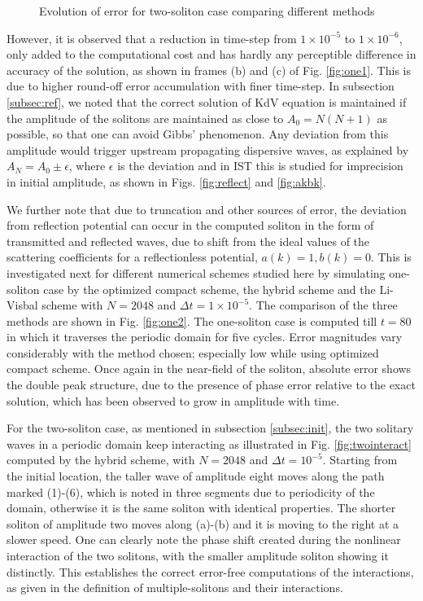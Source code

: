 \documentclass{svjour3}                    %
\begin{document}
\begin{figure}[h!]
{}
\caption{Evolution of error for two-soliton case comparing different methods}
\label{fig:two2}
\end{figure}

However, it is observed that a reduction in time-step from $1 \times 10^{-5}$ to $1 \times 10^{-6}$, only added to the computational cost and has hardly 
any perceptible difference in accuracy of the solution, as shown in frames (b) and (c) of Fig. \ref{fig:one1}. This is due to higher round-off error accumulation with finer time-step. In subsection \ref{subsec:ref}, we noted that the correct solution of KdV equation is maintained if the amplitude of the 
solitons are maintained as close to $A_0 = N(N+1)$ as possible, so that one can avoid Gibbs' phenomenon. Any deviation from this amplitude would trigger upstream propagating dispersive waves, as explained by $A_N = A_0 \pm \epsilon$, where $\epsilon$ is the deviation and in IST this is studied for imprecision in initial amplitude, as shown in Figs. \ref{fig:reflect} and \ref{fig:akbk}. 

We further note that due to truncation and other sources of error, the deviation from reflection potential can occur in the computed soliton in the form of transmitted and reflected waves, due to shift from the ideal values of the scattering coefficients for a reflectionless potential, $a(k)=1,b(k)=0$. 
This is investigated next for different numerical schemes studied here by simulating one-soliton case by the optimized compact scheme, the hybrid scheme and the Li-Visbal scheme with 
$N=2048$ and $\Delta t = 1 \times 10^{-5}$. The comparison of the three methods are shown in Fig. \ref{fig:one2}.
The one-soliton case is computed till $t=80$ in which it traverses the periodic domain for five cycles.  Error magnitudes vary considerably with the method chosen; especially low while using optimized compact scheme. Once again in the near-field of the soliton, absolute error shows the double peak structure, due to the presence of phase error relative to the exact solution, which has been observed to grow in amplitude with time.

For the two-soliton case, as mentioned in subsection \ref{subsec:init}, the two solitary waves in a periodic domain keep interacting as illustrated in Fig. 
\ref{fig:twointeract} computed by the hybrid scheme, with $N = 2048$ and $\Delta t =10^{-5}$. Starting from the initial location, the taller wave of amplitude eight moves along the path marked (1)-(6), which is noted in three segments due to periodicity of the domain, otherwise it is the same 
soliton with identical properties. The shorter soliton of amplitude two moves along (a)-(b) and it is moving to the right at a slower speed. 
One can clearly note the phase shift created during the nonlinear interaction of the two solitons, with the smaller amplitude soliton showing it distinctly. This establishes the correct error-free computations of the interactions, as given in the definition of multiple-solitons and their
interactions.
\end{document}

